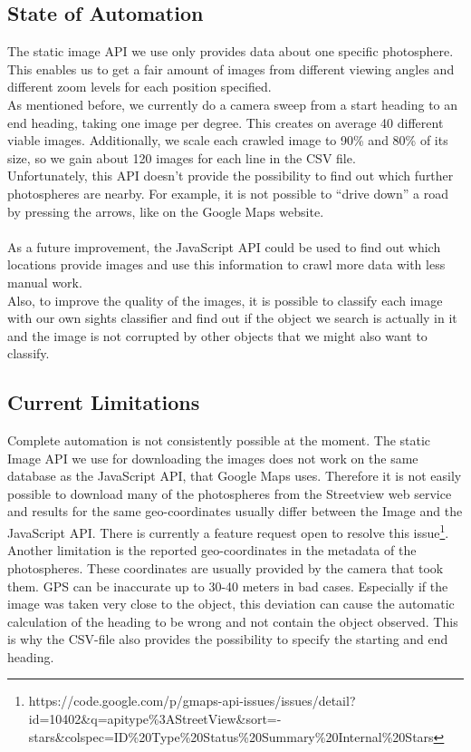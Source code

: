 \subsection{State of Automation}
The static image API we use only provides data about one specific photosphere. This enables us to get a fair amount of images from different viewing angles and different zoom levels for each position specified.\\
As mentioned before, we currently do a camera sweep from a start heading to an end heading, taking one image per degree. This creates on average 40 different viable images. Additionally, we scale each crawled image to 90\% and 80\% of its size, so we gain about 120 images for each line in the CSV file.\\
Unfortunately, this API doesn't provide the possibility to find out which further photospheres are nearby. For example, it is not possible to ``drive down'' a road by pressing the arrows, like on the Google Maps website.\\\\
As a future improvement, the JavaScript API could be used to find out which locations provide images and use this information to crawl more data with less manual work.\\
Also, to improve the quality of the images, it is possible to classify each image with our own sights classifier and find out if the object we search is actually in it and the image is not corrupted by other objects that we might also want to classify.

\subsection{Current Limitations}
Complete automation is not consistently possible at the moment. The static Image API we use for downloading the images does not work on the same database as the JavaScript API, that Google Maps uses. Therefore it is not easily possible to download many of the photospheres from the Streetview web service and results for the same geo-coordinates usually differ between the Image and the JavaScript API. There is currently a feature request open to resolve this issue\footnote{https://code.google.com/p/gmaps-api-issues/issues/detail?id=10402\&q=apitype\%3AStreetView\&sort=-stars\&colspec=ID\%20Type\%20Status\%20Summary\%20Internal\%20Stars}.\\
Another limitation is the reported geo-coordinates in the metadata of the photospheres. These coordinates are usually provided by the camera that took them. GPS can be inaccurate up to 30-40 meters in bad cases. Especially if the image was taken very close to the object, this deviation can cause the automatic calculation of the heading to be wrong and not contain the object observed. This is why the CSV-file also provides the possibility to specify the starting and end heading.

